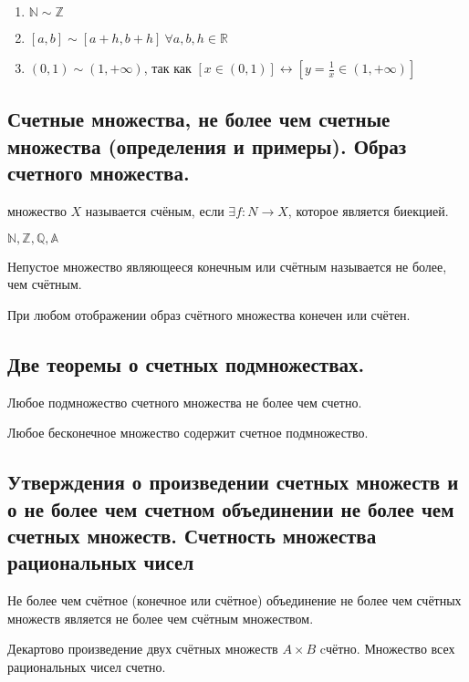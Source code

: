 \documentclass{article}
\begin{document}
\begin{enumerate}
	\item $\mathbb{N} \sim \mathbb{Z}$
	\item $[a, b] \sim [a + h,b + h] \ \forall a, b, h \in \mathbb{R}$
	\item $(0, 1) \sim (1, +\infty)$, так как $[x \in (0, 1)] \leftrightarrow [ y = \displaystyle\frac{1}{x} \in (1, +\infty)]$
\end{enumerate}

\subsection{Счетные множества, не более чем счетные множества (определения и примеры). Образ счетного множества.}
 множество $X$ называется счёным, если $\exists f: N \to X$, которое является биекцией.

 $\mathbb{N}, \mathbb{Z}, \mathbb{Q}, \mathbb{A}$

 Непустое множество являющееся конечным или счётным называется не более, чем счётным. 

 При любом отображении образ счётного множества конечен или счётен.

\subsection{Две теоремы о счетных подмножествах.}

 Любое подмножество счетного множества не более чем счетно.

 Любое бесконечное множество содержит счетное подмножество.


\subsection{Утверждения о произведении счетных множеств и о не более чем счетном объединении не более чем счетных множеств. Счетность множества рациональных чисел}

 Не более чем счётное (конечное или счётное) объединение не более чем счётных множеств является не более чем счётным множеством.

 Декартово произведение двух счётных множеств $A \times B$ cчётно.
 Множество всех рациональных чисел счетно.
 
\end{document}
